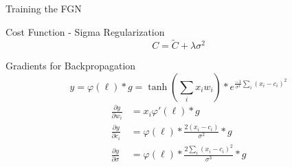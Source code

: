 \documentclass{beamer}
\begin{document}
\begin{frame}{Training the FGN}
    \begin{block}{Cost Function - Sigma Regularization}
    $$ C = \tilde{C} + \lambda\sigma^2  $$
    \end{block}
    
    \begin{block}{Gradients for Backpropagation}
    $$ y =  \varphi(\ell)*g = \tanh(\sum_i x_i w_i) * e^{\frac{-1}{\sigma^2}\sum_{i}(x_i-c_i)^2}$$
    \vspace{-0.6cm}
    \begin{align*}
        \frac{\partial y}{\partial w_i} &=  x_i \varphi'(\ell) * g  \\[1em]
        \frac{\partial y}{\partial c_i} &= \varphi(\ell) * \frac{2(x_i-c_i)}{\sigma^2} * g \\[1em]
        \frac{\partial y}{\partial \sigma} &= \varphi(\ell) * \frac{2\sum_{i}(x_i-c_i)^2}{\sigma^3}* g
    \end{align*}
    \end{block}
    \end{frame}
    
\end{document}
